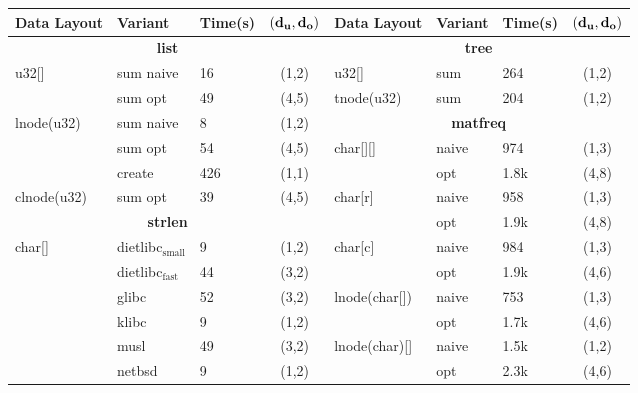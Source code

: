 \begin{figure}[t]
\begin{scriptsize}
\begin{tabular}{lllclllc}
\toprule
{\bf Data Layout} & {\bf Variant} & {\bf Time(s)} & {\bf ${\tt \bf ( d_u, d_o )}$} & {\bf Data Layout} & {\bf Variant} & {\bf Time(s)} & {\bf ${\tt \bf ( d_u, d_o )}$} \\
\midrule
\multicolumn{4}{c}{\bf list} &                                              \multicolumn{4}{c}{\bf tree} \\
u32[] & sum naive & 16 & (1,2) &                                           u32[] & sum & 264 & (1,2) \\
      & sum opt & 49 & (4,5) &                                             tnode(u32) & sum & 204 & (1,2) \\
lnode(u32) & sum naive & 8 & (1,2) &                                      \multicolumn{4}{c}{\bf matfreq} \\             
           & sum opt & 54 & (4,5) &                                       char[][] & naive & 974 & (1,3) \\                                      
           & create & 426 & (1,1) &                                                & opt & 1.8k & (4,8) \\                                       
clnode(u32) & sum opt & 39 & (4,5) &                                      char[r] & naive & 958 & (1,3) \\                                       
\multicolumn{4}{c}{\bf strlen}   &                                            & opt & 1.9k & (4,8) \\                                        
char[] & dietlibc$\mathrm{_{small}}$ & 9 & (1,2) &                             char[c] & naive & 984 & (1,3) \\                                       
       & dietlibc$\mathrm{_{fast}}$ & 44 & (3,2) &                                     & opt & 1.9k & (4,6) \\
       & glibc & 52 & (3,2) &                                                  lnode(char[]) & naive & 753 & (1,3) \\
       & klibc & 9 & (1,2) &                                                         & opt & 1.7k & (4,6) \\ 
       & musl & 49 & (3,2) &                                                   lnode(char)[] & naive & 1.5k & (1,2) \\
       & netbsd & 9 & (1,2) &                                                                & opt & 2.3k & (4,6) \\

\end{tabular}
\end{scriptsize}
\end{figure}
